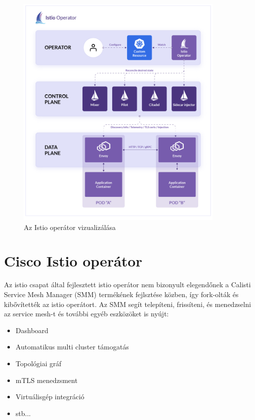 \begin{figure}[ht]
    \centering
         \includegraphics[width=0.9\textwidth]{figures/kubernetes/operator-overview.png}
          \caption{Az Istio operátor vizualizálása \cite{banzaicloudOp}}
           \label{operator-overview}
\end{figure}

\section{Cisco Istio operátor}
Az istio csapat által fejlesztett istio operátor nem bizonyult elegendőnek a Calisti Service Mesh Manager (SMM) termékének fejlsztése közben, így fork-olták és kibővítették az istio operátort. Az SMM segít telepíteni, frissíteni, és menedzselni az service mesh-t és további egyéb eszközöket is nyújt:
\begin{itemize}
    \item Dashboard
    \item Automatikus multi cluster támogatás
    \item Topológiai gráf
    \item mTLS menedzsment
    \item Virtuálisgép integráció
    \item stb...
\end{itemize}

